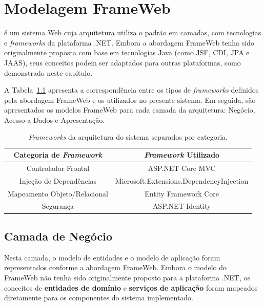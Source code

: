 \chapter{Modelagem FrameWeb}
\label{sec-frameweb}
\vspace{-1cm} %

\emph{\imprimirtitulo} é um sistema Web cuja arquitetura utiliza o padrão em camadas, com tecnologias e \textit{frameworks} da plataforma .NET. Embora a abordagem FrameWeb tenha sido originalmente proposta com base em tecnologias Java (como JSF, CDI, JPA e JAAS), seus conceitos podem ser adaptados para outras plataformas, como demonstrado neste capítulo.

A Tabela~\ref{tabela-frameworks} apresenta a correspondência entre os tipos de \textit{frameworks} definidos pela abordagem FrameWeb e os utilizados no presente sistema. Em seguida, são apresentados os modelos FrameWeb para cada camada da arquitetura: Negócio, Acesso a Dados e Apresentação.

\begin{table}[H]
\centering
\caption{\textit{Frameworks} da arquitetura do sistema separados por categoria.}
\label{tabela-frameworks}
\begin{tabular}{|c|c|}
\hline
\textbf{Categoria de \textit{Framework}}& \textbf{\textit{Framework} Utilizado} \\\hline
Controlador Frontal & ASP.NET Core MVC \\\hline
Injeção de Dependências & Microsoft.Extensions.DependencyInjection \\\hline
Mapeamento Objeto/Relacional & Entity Framework Core \\\hline
Segurança & ASP.NET Identity \\\hline
\end{tabular}
\end{table}

\section{Camada de Negócio}
\label{sec-frameweb-negocio}

Nesta camada, o modelo de entidades e o modelo de aplicação foram representados conforme a abordagem FrameWeb. Embora o modelo do FrameWeb não tenha sido originalmente proposto para a plataforma .NET, os conceitos de \textbf{entidades de domínio} e \textbf{serviços de aplicação} foram mapeados diretamente para os componentes do sistema implementado.

